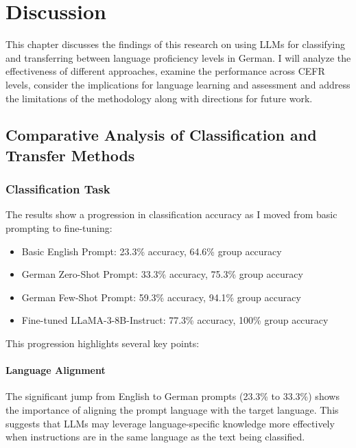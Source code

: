 \chapter{Discussion}
\label{ch:discussion}

This chapter discusses the findings of this research on using LLMs for classifying and transferring between language proficiency levels in German. I will analyze the effectiveness of different approaches, examine the performance across CEFR levels, consider the implications for language learning and assessment and address the limitations of the methodology along with directions for future work.

\section{Comparative Analysis of Classification and Transfer Methods}
\label{s:comparative_analysis_of_methods}

\subsection{Classification Task}
\label{ss:classification_task}

The results show a progression in classification accuracy as I moved from basic prompting to fine-tuning:

\begin{itemize}
    \item Basic English Prompt: 23.3\% accuracy, 64.6\% group accuracy
    \item German Zero-Shot Prompt: 33.3\% accuracy, 75.3\% group accuracy
    \item German Few-Shot Prompt: 59.3\% accuracy, 94.1\% group accuracy
    \item Fine-tuned LLaMA-3-8B-Instruct: 77.3\% accuracy, 100\% group accuracy
\end{itemize}

This progression highlights several key points:

\subsubsection{Language Alignment}
\label{sss:language_alignment}
The significant jump from English to German prompts (23.3\% to 33.3\%) shows the importance of aligning the prompt language with the target language. This suggests that LLMs may leverage language-specific knowledge more effectively when instructions are in the same language as the text being classified.

